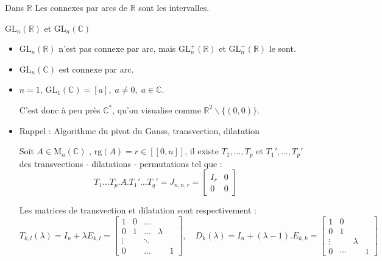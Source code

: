 \begin{Example}{Dans $\mathbb{R}$}{} \label{ex1}
Les connexes par arcs de $\mathbb{R}$ sont les intervalles.
\end{Example}

\begin{Example}{$\mathrm{GL} _n(\mathbb{R} )$ et $\mathrm{GL} _n(\mathbb{C})$}{}
\begin{itemize}
    \item $\mathrm{GL} _n(\mathbb{R} )$ n'est pas connexe par arc, mais $\mathrm{GL}_n ^+(\mathbb{R})$ et $\mathrm{GL}_n ^ - ( \mathbb{R})$ le sont.
    \item $\mathrm{GL} _n(\mathbb{C} )$ est connexe par arc.
\end{itemize}
\end{Example}

\begin{myproof} 
\begin{itemize}
    \item $n=1$, $\mathrm{GL}_1 (\mathbb{C} ) = [a] ,\; a\ne 0, \; a \in \mathbb{C}$.

        C'est donc à peu près $\mathbb{C} ^{*}$, qu'on visualise comme $\mathbb{R} ^{2}\backslash \{(0,0)\}$.
        \begin{center}
        \end{center}
    \item
        Rappel : Algorithme du pivot du Gauss, transvection, dilatation

        Soit $A \in \mathrm{M} _n(\mathbb{C} )$ , $\mathrm{rg} (A) = r \in [\![0,n]\!]$, il existe $T_1,\ldots,T_p$ et $T_1',\ldots,T_p'$ des transvections - dilatations - permutations tel que :
        \[
            T_1\ldots T_p.A.T_1'\ldots T_q' = J_{n,n,r} = \begin{bmatrix} I_r & 0 \\ 0 & 0  \end{bmatrix} 
        \]

        Les matrices de transvection et dilatation sont respectivement : $$T_{k,l}(\lambda) = I_n + \lambda E_{k,l} = \begin{bmatrix} 1 & 0 & \ldots \\ 0 & 1 & \ldots & \lambda &  \\ \vdots &  & \ddots\\ 0 &&  \ldots && 1\end{bmatrix}, \quad D_{k}(\lambda) = I_n + (\lambda-1) . E_{k,k} = \begin{bmatrix} 1 & 0 \\ 0 & 1 \\ \vdots & & \lambda \\ 0 & \cdots & & 1 \end{bmatrix} $$
        

\end{itemize}
\end{myproof}
